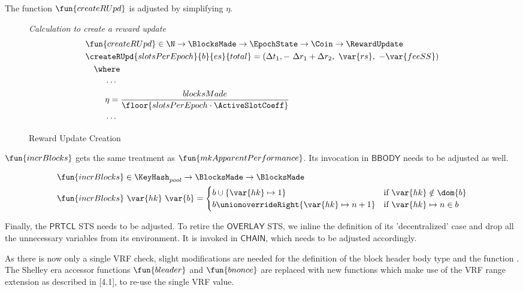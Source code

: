 The function $\fun{createRUpd}$ is adjusted by simplifying $\eta$.

\begin{figure}[htb]
  \emph{Calculation to create a reward update}
  \begin{align*}
    & \fun{createRUpd} \in \N \to \BlocksMade \to \EpochState \to \Coin \to \RewardUpdate \\
    & \createRUpd{slotsPerEpoch}{b}{es}{total} = \left(
      \Delta t_1,-~\Delta r_1+\Delta r_2,~\var{rs},~-\var{feeSS}\right) \\
    & ~~~\where \\
    & ~~~~~~~\dotsb \\
    & ~~~~~~~\eta =
        \frac{blocksMade}{\floor{{slotsPerEpoch} \cdot \ActiveSlotCoeff}} \\
    & ~~~~~~~\dotsb
  \end{align*}

  \caption{Reward Update Creation}
  \label{fig:functions:reward-update-creation}
\end{figure}

$\fun{incrBlocks}$ gets the same treatment as $\fun{mkApparentPerformance}$. Its invocation in $\mathsf{BBODY}$ needs to be adjusted as well.

\begin{figure}
  \begin{align*}
      & \fun{incrBlocks} \in \KeyHash_{pool} \to
          \BlocksMade \to \BlocksMade \\
      & \fun{incrBlocks}~\var{hk}~\var{b} =
        \begin{cases}
          b\cup\{\var{hk}\mapsto 1\} & \text{if }\var{hk}\notin\dom{b} \\
          b\unionoverrideRight\{\var{hk}\mapsto n+1\} & \text{if }\var{hk}\mapsto n\in b \\
        \end{cases}
  \end{align*}
\end{figure}

\newpage
Finally, the $\mathsf{PRTCL}$ STS needs to be adjusted.
To retire the $\mathsf{OVERLAY}$ STS, we inline the definition of its
'decentralized' case and drop all the unnecessary variables from its environment.
It is invoked in $\mathsf{CHAIN}$, which needs to be adjusted accordingly.

As there is now only a single VRF check, slight modifications are needed for the
definition of the block header body  type and the function .
The Shelley era accessor functions $\fun{bleader}$ and $\fun{bnonce}$ are replaced with new functions
which make use of the VRF range extension as described in \cite{vrf-range-extension}[4.1],
to re-use the single VRF value.

